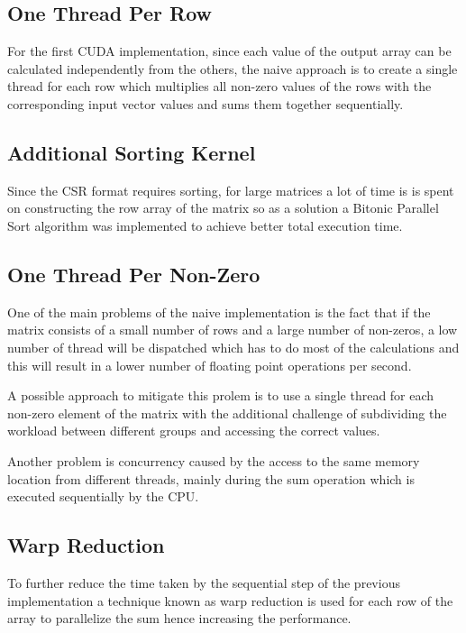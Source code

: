 \documentclass[conference]{IEEEtran}
\begin{document}
    \subsection{One Thread Per Row}

    For the first CUDA implementation, since each value of the output array can
    be calculated independently from the others, the naive approach is to create
    a single thread for each row which multiplies all non-zero values of the rows
    with the corresponding input vector values and sums them together sequentially.

    \subsection{Additional Sorting Kernel}

    Since the CSR format requires sorting, for large matrices a lot of time is
    is spent on constructing the row array of the matrix so as a solution a Bitonic
    Parallel Sort algorithm was implemented to achieve better total execution time.

    \subsection{One Thread Per Non-Zero}

    One of the main problems of the naive implementation is the fact that if the
    matrix consists of a small number of rows and a large number of non-zeros, a
    low number of thread will be dispatched which has to do most of the calculations
    and this will result in a lower number of floating point operations per second.

    A possible approach to mitigate this prolem is to use a single thread for each
    non-zero element of the matrix with the additional challenge of subdividing
    the workload between different groups and accessing the correct values.

    Another problem is concurrency caused by the access to the same memory location
    from different threads, mainly during the sum operation which is executed sequentially
    by the CPU.

    \subsection{Warp Reduction}

    To further reduce the time taken by the sequential step of the previous implementation
    a technique known as warp reduction is used for each row of the array to parallelize
    the sum hence increasing the performance. 
\end{document}
